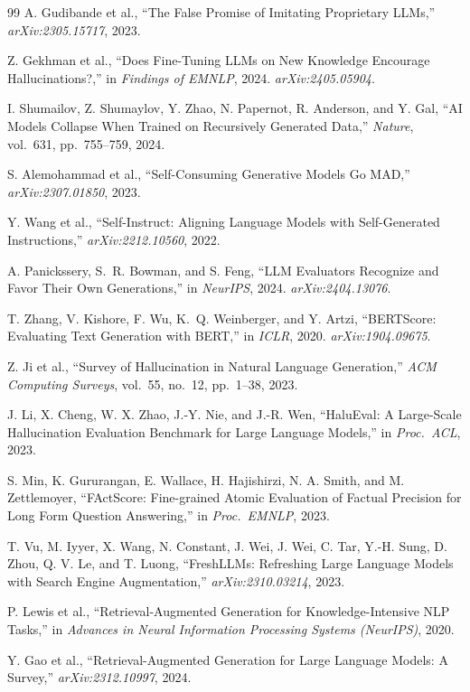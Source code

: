 \documentclass[11pt]{article}
\begin{document}
\begin{thebibliography}{99}
A. Gudibande et al., ``The False Promise of Imitating Proprietary LLMs,'' \textit{arXiv:2305.15717}, 2023.

Z. Gekhman et al., ``Does Fine-Tuning LLMs on New Knowledge Encourage Hallucinations?,'' in \textit{Findings of EMNLP}, 2024. \textit{arXiv:2405.05904}.

I. Shumailov, Z. Shumaylov, Y. Zhao, N. Papernot, R. Anderson, and Y. Gal, ``AI Models Collapse When Trained on Recursively Generated Data,'' \textit{Nature}, vol.~631, pp.~755--759, 2024.

S. Alemohammad et al., ``Self-Consuming Generative Models Go MAD,'' \textit{arXiv:2307.01850}, 2023.

Y. Wang et al., ``Self-Instruct: Aligning Language Models with Self-Generated Instructions,'' \textit{arXiv:2212.10560}, 2022.

A. Panickssery, S.~R. Bowman, and S. Feng, ``LLM Evaluators Recognize and Favor Their Own Generations,'' in \textit{NeurIPS}, 2024. \textit{arXiv:2404.13076}.

T. Zhang, V. Kishore, F. Wu, K.~Q. Weinberger, and Y. Artzi, ``BERTScore: Evaluating Text Generation with BERT,'' in \textit{ICLR}, 2020. \textit{arXiv:1904.09675}.

Z. Ji et al., ``Survey of Hallucination in Natural Language Generation,'' \textit{ACM Computing Surveys}, vol.~55, no.~12, pp.~1--38, 2023.

J. Li, X. Cheng, W. X. Zhao, J.-Y. Nie, and J.-R. Wen, ``HaluEval: A Large-Scale Hallucination Evaluation Benchmark for Large Language Models,'' in \textit{Proc.\ ACL}, 2023.

S. Min, K. Gururangan, E. Wallace, H. Hajishirzi, N. A. Smith, and M. Zettlemoyer, ``FActScore: Fine-grained Atomic Evaluation of Factual Precision for Long Form Question Answering,'' in \textit{Proc.\ EMNLP}, 2023.

T. Vu, M. Iyyer, X. Wang, N. Constant, J. Wei, J. Wei, C. Tar, Y.-H. Sung, D. Zhou, Q. V. Le, and T. Luong, ``FreshLLMs: Refreshing Large Language Models with Search Engine Augmentation,'' \textit{arXiv:2310.03214}, 2023.

P. Lewis et al., ``Retrieval-Augmented Generation for Knowledge-Intensive NLP Tasks,'' in \textit{Advances in Neural Information Processing Systems (NeurIPS)}, 2020.

Y. Gao et al., ``Retrieval-Augmented Generation for Large Language Models: A Survey,'' \textit{arXiv:2312.10997}, 2024.

\end{thebibliography}
\end{document}
